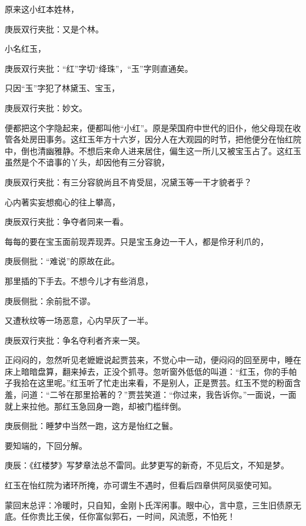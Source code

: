 \begin{parag}
    原来这小红本姓林，\begin{note}庚辰双行夹批：又是个林。\end{note}小名红玉，\begin{note}庚辰双行夹批：“红”字切“绛珠”，“玉”字则直通矣。\end{note}只因“玉”字犯了林黛玉、宝玉，\begin{note}庚辰双行夹批：妙文。\end{note}便都把这个字隐起来，便都叫他“小红”。原是荣国府中世代的旧仆，他父母现在收管各处房田事务。这红玉年方十六岁，因分人在大观园的时节，把他便分在怡红院中，倒也清幽雅静。不想后来命人进来居住，偏生这一所儿又被宝玉占了。这红玉虽然是个不谙事的丫头，却因他有三分容貌，\begin{note}庚辰双行夹批：有三分容貌尚且不肯受屈，况黛玉等一干才貌者乎？\end{note}心内著实妄想痴心的往上攀高，\begin{note}庚辰双行夹批：争夺者同来一看。\end{note}每每的要在宝玉面前现弄现弄。只是宝玉身边一干人，都是伶牙利爪的，\begin{note}庚辰侧批：“难说”的原故在此。\end{note}那里插的下手去。不想今儿才有些消息，\begin{note}庚辰侧批：余前批不谬。\end{note}又遭秋纹等一场恶意，心内早灰了一半。\begin{note}庚辰双行夹批：争名夺利者齐来一哭。\end{note}正闷闷的，忽然听见老嬷嬷说起贾芸来，不觉心中一动，便闷闷的回至房中，睡在床上暗暗盘算，翻来掉去，正没个抓寻。忽听窗外低低的叫道：“红玉，你的手帕子我拾在这里呢。”红玉听了忙走出来看，不是别人，正是贾芸。红玉不觉的粉面含羞，问道：“二爷在那里拾著的？”贾芸笑道：“你过来，我告诉你。”一面说，一面就上来拉他。那红玉急回身一跑，却被门槛绊倒。\begin{note}庚辰侧批：睡梦中当然一跑，这方是怡红之鬟。\end{note}要知端的，下回分解。
\end{parag}


\begin{parag}
    \begin{note}庚辰：《红楼梦》写梦章法总不雷同。此梦更写的新奇，不见后文，不知是梦。\end{note}
\end{parag}


\begin{parag}
    \begin{note}红玉在怡红院为诸环所掩，亦可谓生不遇时，但看后四章供阿凤驱使可知。\end{note}
\end{parag}


\begin{parag}
    \begin{note}蒙回末总评：冷暖时，只自知，金刚卜氏浑闲事。眼中心，言中意，三生旧债原无底。任你贵比王侯，任你富似郭石，一时间，风流愿，不怕死！\end{note}
\end{parag}

